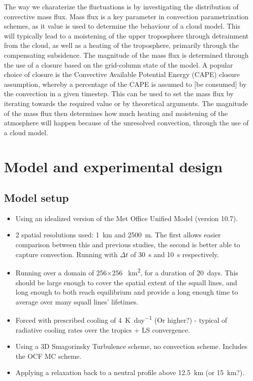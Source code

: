 \documentclass[11pt,a4paper]{article}
\begin{document}
The way we charaterize the fluctuations is by investigating the distribution of convective mass flux. Mass flux is a key parameter in convection parametrization schemes, as it value is used to determine the behaviour of a cloud model. This will typically lead to a moistening of the upper troposphere through detrainment from the cloud, as well as a heating of the troposphere, primarily through the compensating subsidence. The magnitude of the mass flux is determined through the use of a closure based on the grid-column state of the model. A popular choice of closure is the Convective Available Potential Energy (CAPE) closure assumption, whereby a percentage of the CAPE is assumed to [be consumed] by the convection in a given timestep. This can be used to set the mass flux by iterating towards the required value or by theoretical arguments. The magnitude of the mass flux then determines how much heating and moistening of the atmosphere will happen because of the unresolved convection, through the use of a cloud model.

\section{Model and experimental design}

\subsection{Model setup}

\begin{itemize}
    \item Using an idealized version of the Met Office Unified Model (version 10.7).
    \item 2 spatial resolutions used: \SI{1}{km} and \SI{2500}{m}. The first allows easier comparison between this and previous studies, the second is better able to capture convection. Running with $\Delta t$ of \SI{30}{s} and \SI{10}{s} respectively.
    \item Running over a domain of 256$\times$256 \SI{}{km^2}, for a duration of \SI{20}{days}. This should be large enough to cover the spatial extent of the squall lines, and long enough to both reach equilibrium and provide a long enough time to average over many squall lines' lifetimes.
    \item Forced with prescribed cooling of \SI{4}{K.day^{-1}} (Or higher?) - typical of radiative cooling rates over the tropics + LS convergence.
    \item Using a 3D Smagorinsky Turbulence scheme, no convection scheme. Includes the OCF MC scheme.
    \item Applying a relaxation back to a neutral profile above \SI{12.5}{km} (or \SI{15}{km}?).
\end{itemize}
\end{document}
